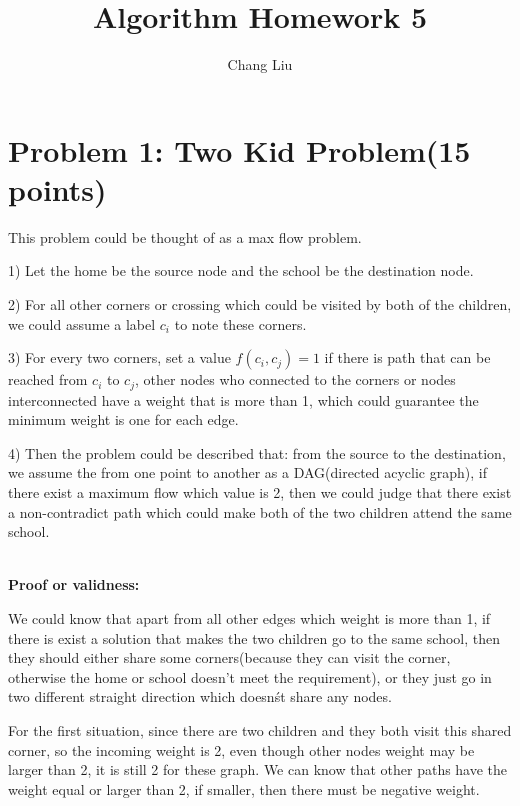 \documentclass{article}
\title{Algorithm Homework 5}
\author{Chang Liu}
\begin{document}
\pagestyle{main}

\section{Problem 1: Two Kid Problem(15 points)}
This problem could be thought of as a max flow problem.

1) Let the home be the source node and the school be the destination node.

2) For all other corners or crossing which could be visited by both of the children, we could assume a label $c_{i}$
to note these corners.

3) For every two corners, set a value $f(c_{i}, c_{j}) = 1$ if there is path that can be reached from $c_{i}$ to $c_{j}$, other nodes who connected to the corners or nodes interconnected have a weight that is more than 1, which could guarantee the minimum weight is one for each edge.

4) Then the problem could be described that: from the source to the destination, we assume the from one point to another
as a DAG(directed acyclic graph), if there exist a maximum flow which value is 2, then we could judge that there exist a
non-contradict path which could make both of the two children attend the same school.

~\\
\textbf{Proof or validness:}

We could know that apart from all other edges which weight is more than 1, if there is exist a solution that makes the
two children go to the same school, then they should either share some corners(because they can visit the corner, otherwise the home or school doesn't meet the requirement), or they just go in two different straight direction which
doesn\'st share any nodes.

For the first situation, since there are two children and they both visit this shared corner, so the incoming weight is
2, even though other nodes weight may be larger than 2, it is still 2 for these graph. We can know that other paths have
the weight equal or larger than 2, if smaller, then there must be negative weight.
\end{document}
